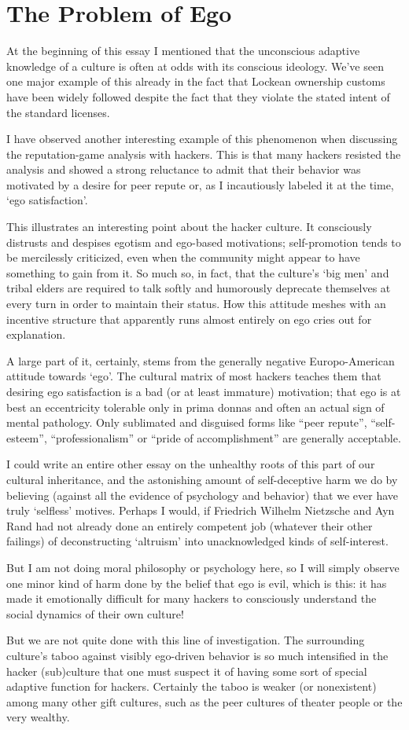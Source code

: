 \section{The Problem of Ego}

At the beginning of this essay I mentioned that the unconscious adaptive
knowledge of a culture is often at odds with its conscious ideology.  We've seen
one major example of this already in the fact that Lockean ownership customs
have been widely followed despite the fact that they violate the stated intent
of the standard licenses.

I have observed another interesting example of this phenomenon when discussing
the reputation-game analysis with hackers.  This is that many hackers resisted
the analysis and showed a strong reluctance to admit that their behavior was
motivated by a desire for peer repute or, as I incautiously labeled it at the
time, `ego satisfaction'.

This illustrates an interesting point about the hacker culture.  It consciously
distrusts and despises egotism and ego-based motivations; self-promotion tends
to be mercilessly criticized, even when the community might appear to have
something to gain from it.  So much so, in fact, that the culture's `big men'
and tribal elders are required to talk softly and humorously deprecate
themselves at every turn in order to maintain their status.  How this attitude
meshes with an incentive structure that apparently runs almost entirely on ego
cries out for explanation.

A large part of it, certainly, stems from the generally negative Europo-American
attitude towards `ego'.  The cultural matrix of most hackers teaches them that
desiring ego satisfaction is a bad (or at least immature) motivation; that ego
is at best an eccentricity tolerable only in prima donnas and often an actual
sign of mental pathology.  Only sublimated and disguised forms like ``peer
repute'', ``self-esteem'', ``professionalism'' or ``pride of accomplishment''
are generally acceptable.

I could write an entire other essay on the unhealthy roots of this part of our
cultural inheritance, and the astonishing amount of self-deceptive harm we do by
believing (against all the evidence of psychology and behavior) that we ever
have truly `selfless' motives.  Perhaps I would, if Friedrich Wilhelm Nietzsche
and Ayn Rand had not already done an entirely competent job (whatever their
other failings) of deconstructing `altruism' into unacknowledged kinds of
self-interest.

But I am not doing moral philosophy or psychology here, so I will simply observe
one minor kind of harm done by the belief that ego is evil, which is this: it
has made it emotionally difficult for many hackers to consciously understand the
social dynamics of their own culture!

But we are not quite done with this line of investigation.  The surrounding
culture's taboo against visibly ego-driven behavior is so much intensified in
the hacker (sub)culture that one must suspect it of having some sort of special
adaptive function for hackers.  Certainly the taboo is weaker (or nonexistent)
among many other gift cultures, such as the peer cultures of theater people or
the very wealthy.
